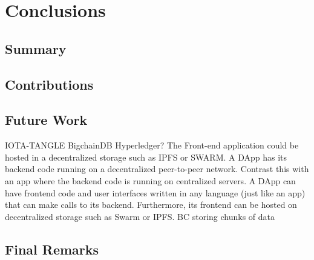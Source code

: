 \chapter{Conclusions}
\label{ch:closure}


\section{Summary}

\section{Contributions}

\section{Future Work}

IOTA-TANGLE
BigchainDB
Hyperledger?
The Front-end application could be hosted in a decentralized storage such as IPFS or SWARM.
A DApp has its backend code running on a decentralized peer-to-peer network. Contrast this with an app where the backend code is running on centralized servers. A DApp can have frontend code and user interfaces written in any language (just like an app) that can make calls to its backend. Furthermore, its frontend can be hosted on decentralized storage such as Swarm or IPFS.
BC storing chunks of data

\section{Final Remarks}
